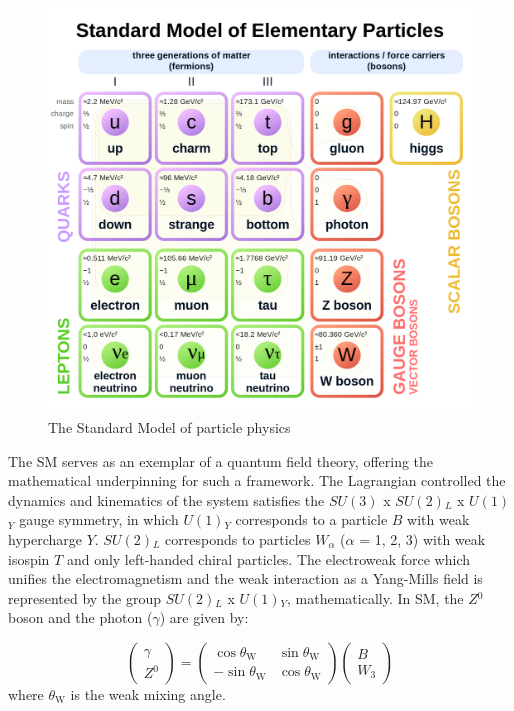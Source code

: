 \documentclass[UTF8,12pt]{ctexart}
\numberwithin{equation}{section}
\def\ga{\gamma}
\begin{document}
\begin{figure}[htb] 
	\centering  
	\includegraphics[width=14cm]{./fig/SM-p.png}
	\caption{The Standard Model of particle physics~\cite{lbnl}}
	\label{fig:SM}
\end{figure}

The SM  serves as an exemplar of a quantum field theory, offering the mathematical underpinning for such a framework. The Lagrangian controlled the dynamics and kinematics of the system satisfies the $SU(3)$ x $SU(2)$$_L$ x $U(1)$$_Y$ gauge symmetry, in which $U(1)$$_Y$ corresponds to a particle $B$ with weak hypercharge $Y$. $SU(2)$$_L$ corresponds to particles $W$$_\alpha$ ($\alpha$ = 1, 2, 3) with weak isospin $T$ and only left-handed chiral particles. The electroweak force which unifies the electromagnetism and the weak interaction as a Yang-Mills field is represented by the group $SU(2)$$_L$ x $U(1)$$_Y$, mathematically. In SM, the $Z$$^0$ boson and the photon ($\ga$) are given by: 

\begin{equation}
\left(\begin{array}{c}\gamma \\ Z^{0}\end{array}\right)=\left(\begin{array}{cc}\cos \theta_{\mathrm{W}} & \sin \theta_{\mathrm{W}} \\ -\sin \theta_{\mathrm{W}} & \cos \theta_{\mathrm{W}}\end{array}\right)\left(\begin{array}{c}B \\ W_{3}\end{array}\right)
\end{equation}
where $\theta_{\mathrm{W}}$ is the weak mixing angle. 
\end{document}
